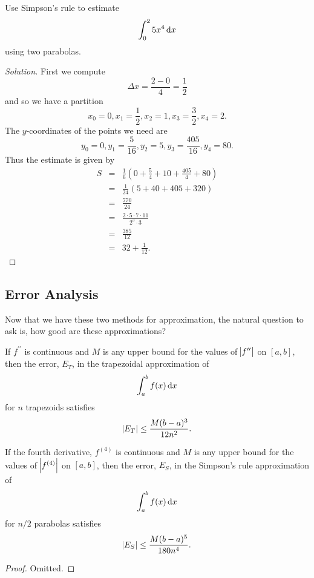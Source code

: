 \documentclass[reqno, 12pt]{amsart}
\begin{document}
\begin{example}
  Use Simpson's rule to estimate
  \[\int_0^2 5x^4 \dif x\]
  using two parabolas.
\end{example}

\begin{proof}[Solution]
  First we compute
  \[\Delta x = \frac{2 - 0}{4} = \frac{1}{2}\]
  and so we have a partition
  \[x_0 = 0, x_1 = \frac{1}{2}, x_2 = 1, x_3 = \frac{3}{2}, x_4 = 2.\]
  The \(y\)-coordinates of the points we need are
  \[y_0 = 0, y_1 = \frac{5}{16}, y_2 = 5, y_3 = \frac{405}{16}, y_4 = 80.\]
  Thus the estimate is given by
  \begin{eqnarray*}
    S &=& \frac{1}{6}(0 + \frac{5}{4} + 10 + \frac{405}{4} + 80)\\
    &=& \frac{1}{24}(5 + 40 + 405 + 320)\\
    &=& \frac{770}{24}\\
    &=& \frac{2\cdot 5\cdot7\cdot 11}{2^3\cdot 3}\\
    &=& \frac{385}{12}\\
    &=& 32 + \frac{1}{12}.
  \end{eqnarray*}
\end{proof}

\subsection{Error Analysis}
Now that we have these two methods for approximation, the natural question to ask is, how good are these approximations?
\begin{theorem}
  If \(f^{\prime\prime}\) is continuous and \(M\) is any upper bound for the values of \(\abs{f^{\prime\prime}}\) on \([a,b]\), then the error, \(E_T\), in the trapezoidal approximation of
  \[\int_a^b f(x)\dif x\]
  for \(n\) trapezoids satisfies
  \[\abs{E_T} \leq \frac{M(b-a)^3}{12n^2}.\]

  If the fourth derivative, \(f^{(4)}\) is continuous and \(M\) is any upper bound for the values of \(\abs{f^{(4)}}\) on \([a,b]\), then the error, \(E_S\), in the Simpson's rule approximation of
  \[\int_a^b f(x)\dif x\]
  for \(n/2\) parabolas satisfies
  \[\abs{E_S} \leq \frac{M(b-a)^5}{180n^4}.\]
\end{theorem}
\begin{proof}
  Omitted.
\end{proof}
\end{document}

